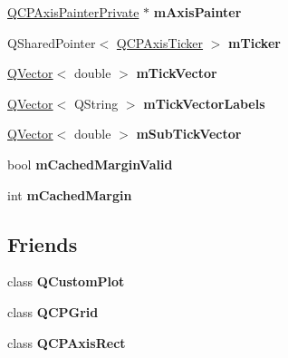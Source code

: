 \begin{DoxyCompactItemize}
\item 
\hyperlink{class_q_c_p_axis_painter_private}{Q\+C\+P\+Axis\+Painter\+Private} $\ast$ {\bfseries m\+Axis\+Painter}\hypertarget{class_q_c_p_axis_a6f706c9e9da89c18e94067b859e4f3c7}{}\label{class_q_c_p_axis_a6f706c9e9da89c18e94067b859e4f3c7}

\item 
Q\+Shared\+Pointer$<$ \hyperlink{class_q_c_p_axis_ticker}{Q\+C\+P\+Axis\+Ticker} $>$ {\bfseries m\+Ticker}\hypertarget{class_q_c_p_axis_adc991d91b12f6c427bb194473ce18080}{}\label{class_q_c_p_axis_adc991d91b12f6c427bb194473ce18080}

\item 
\hyperlink{class_q_vector}{Q\+Vector}$<$ double $>$ {\bfseries m\+Tick\+Vector}\hypertarget{class_q_c_p_axis_a6f231b4ba48570a3ab71d62a7d5ec84c}{}\label{class_q_c_p_axis_a6f231b4ba48570a3ab71d62a7d5ec84c}

\item 
\hyperlink{class_q_vector}{Q\+Vector}$<$ Q\+String $>$ {\bfseries m\+Tick\+Vector\+Labels}\hypertarget{class_q_c_p_axis_ac9d1aeb1e401bd421d12848742d84fe2}{}\label{class_q_c_p_axis_ac9d1aeb1e401bd421d12848742d84fe2}

\item 
\hyperlink{class_q_vector}{Q\+Vector}$<$ double $>$ {\bfseries m\+Sub\+Tick\+Vector}\hypertarget{class_q_c_p_axis_a173cc7f7e9fe3c58e61ea4a5adb6f00a}{}\label{class_q_c_p_axis_a173cc7f7e9fe3c58e61ea4a5adb6f00a}

\item 
bool {\bfseries m\+Cached\+Margin\+Valid}\hypertarget{class_q_c_p_axis_a2cde37b6e385f47e11322df4ac1b0e9b}{}\label{class_q_c_p_axis_a2cde37b6e385f47e11322df4ac1b0e9b}

\item 
int {\bfseries m\+Cached\+Margin}\hypertarget{class_q_c_p_axis_a48ace55cbd54f7241e7f1b06fd369b64}{}\label{class_q_c_p_axis_a48ace55cbd54f7241e7f1b06fd369b64}

\end{DoxyCompactItemize}
\subsection*{Friends}
\begin{DoxyCompactItemize}
\item 
class {\bfseries Q\+Custom\+Plot}\hypertarget{class_q_c_p_axis_a00f8b42d059625f815808a7cc99c2f04}{}\label{class_q_c_p_axis_a00f8b42d059625f815808a7cc99c2f04}

\item 
class {\bfseries Q\+C\+P\+Grid}\hypertarget{class_q_c_p_axis_aba5bcc293a6df1e0d98056ba3faf982b}{}\label{class_q_c_p_axis_aba5bcc293a6df1e0d98056ba3faf982b}

\item 
class {\bfseries Q\+C\+P\+Axis\+Rect}\hypertarget{class_q_c_p_axis_a34deb2f894a2e4188ca024f20ccbefc1}{}\label{class_q_c_p_axis_a34deb2f894a2e4188ca024f20ccbefc1}

\end{DoxyCompactItemize}


